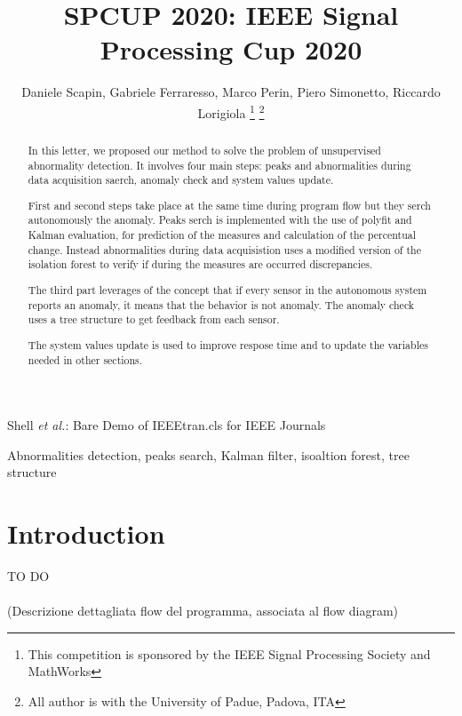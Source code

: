 \documentclass[journal]{IEEEtran}
\begin{document}
\title{SPCUP 2020: IEEE Signal Processing Cup 2020}

\author{Daniele Scapin, Gabriele Ferraresso, Marco Perin, Piero Simonetto, Riccardo Lorigiola
\thanks{This competition is sponsored by the IEEE Signal Processing Society and MathWorks}
\thanks{All author is with the University of Padue, Padova, ITA}}

{Shell \MakeLowercase{\textit{et al.}}: Bare Demo of IEEEtran.cls for IEEE Journals}
\maketitle

\begin{abstract}
In this letter, we proposed our method to solve the problem of unsupervised abnormality detection.
It involves four main steps: peaks and abnormalities during data acquisition saerch, anomaly check and system values update.

First and second steps take place at the same time during program flow but they serch autonomously the anomaly.
Peaks serch is implemented with the use of polyfit and Kalman evaluation, for prediction of the measures and 
calculation of the percentual change. Instead abnormalities during data acquisistion uses a modified version
of the isolation forest to verify if during the measures are occurred discrepancies.

The third part leverages of the concept that if every sensor in the autonomous system reports an anomaly, it means that
the behavior is not anomaly. The anomaly check uses a tree structure to get feedback from each sensor.

The system values update is used to improve respose time and to update the variables needed in other sections.
\end{abstract}

\begin{IEEEkeywords}
Abnormalities detection, peaks search, Kalman filter, isoaltion forest, tree structure
\end{IEEEkeywords}

\IEEEpeerreviewmaketitle{}

\section{Introduction}

\IEEEPARstart
{T}O DO
\\\\(Descrizione dettagliata flow del programma, associata al flow diagram)
\end{document}
